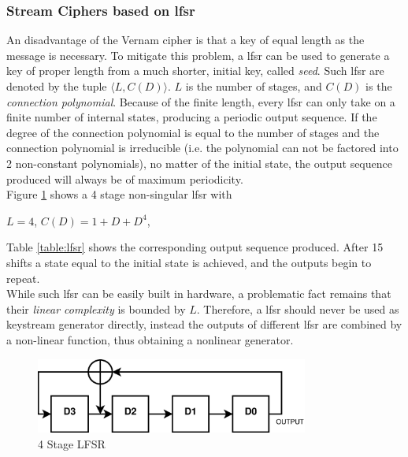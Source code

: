 \subsubsection{Stream Ciphers based on \gls{lfsr}}

An disadvantage of the Vernam cipher is that a key of equal length as the message is necessary. To mitigate this problem, a \gls{lfsr} can be used to generate
a key of proper length from a much shorter, initial key, called \textit{seed}. Such \gls{lfsr} are denoted by the tuple $\langle L, C(D) \rangle$. $L$ is the number of stages, and $C(D)$ is the
\textit{connection polynomial}. Because of the finite length, every \gls{lfsr} can only take on a finite number of internal states, producing
a periodic output sequence.
If the degree of the connection polynomial is equal to the number of stages and the connection polynomial is irreducible (i.e. the polynomial can not
be factored into 2 non-constant polynomials), no matter of the initial state, the output sequence produced will always be of maximum periodicity.
\\
Figure \ref{fig:lsfr} shows a 4 stage non-singular \gls{lfsr} with
\begin{center}
 $L=4$,  $C(D) = 1 + D + D^4$,
\end{center}
Table \ref{table:lfsr} \cite{handbookLFSR} shows the corresponding output sequence produced. After
15 shifts a state equal to the initial state is achieved, and the outputs
begin to repeat.
\\
While such \gls{lfsr} can be easily built in hardware, a problematic fact remains that their \textit{linear complexity} is bounded by $L$. Therefore, a \gls{lfsr}
should never be used as keystream generator directly, instead the outputs of different \gls{lfsr} are combined by a non-linear function, thus obtaining a
nonlinear generator.
\begin{figure}
    \centering
    \includegraphics[width=0.8\textwidth]{figures/LSFR.eps}
    \caption{4 Stage LFSR}
    \label{fig:lsfr}
\end{figure}
